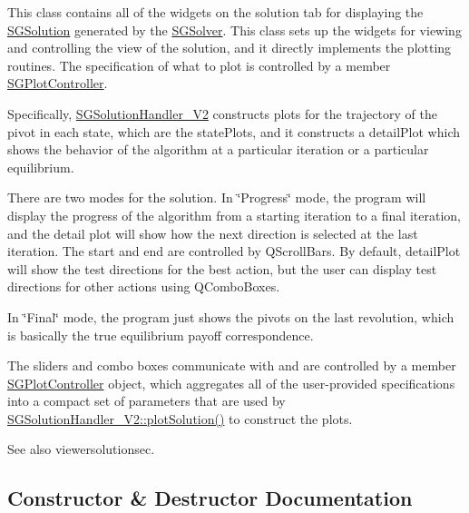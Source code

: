 This class contains all of the widgets on the solution tab for displaying the \hyperlink{classSGSolution}{S\+G\+Solution} generated by the \hyperlink{classSGSolver}{S\+G\+Solver}. This class sets up the widgets for viewing and controlling the view of the solution, and it directly implements the plotting routines. The specification of what to plot is controlled by a member \hyperlink{classSGPlotController}{S\+G\+Plot\+Controller}.

Specifically, \hyperlink{classSGSolutionHandler__V2}{S\+G\+Solution\+Handler\+\_\+\+V2} constructs plots for the trajectory of the pivot in each state, which are the state\+Plots, and it constructs a detail\+Plot which shows the behavior of the algorithm at a particular iteration or a particular equilibrium.

There are two modes for the solution. In \char`\"{}\+Progress\char`\"{} mode, the program will display the progress of the algorithm from a starting iteration to a final iteration, and the detail plot will show how the next direction is selected at the last iteration. The start and end are controlled by Q\+Scroll\+Bars. By default, detail\+Plot will show the test directions for the best action, but the user can display test directions for other actions using Q\+Combo\+Boxes.

In \char`\"{}\+Final\char`\"{} mode, the program just shows the pivots on the last revolution, which is basically the true equilibrium payoff correspondence.

The sliders and combo boxes communicate with and are controlled by a member \hyperlink{classSGPlotController}{S\+G\+Plot\+Controller} object, which aggregates all of the user-\/provided specifications into a compact set of parameters that are used by \hyperlink{classSGSolutionHandler__V2_a439bc1bf22c71391bf15ab56162033c7}{S\+G\+Solution\+Handler\+\_\+\+V2\+::plot\+Solution()} to construct the plots.

See also viewersolutionsec. 

\subsection{Constructor \& Destructor Documentation}
\mbox{\label{classSGSolutionHandler__V2_ac7cdb688062432d9f103485689908d01}} 
